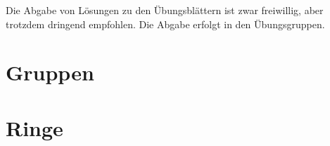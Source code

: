 \documentclass{../util/algebra}
\begin{document}
Die Abgabe von Lösungen zu den Übungsblättern ist zwar freiwillig, aber trotzdem dringend empfohlen. Die Abgabe erfolgt in den Übungsgruppen.

\section{Gruppen}


\section{Ringe}


\printindex

\printbibliography
\end{document}
